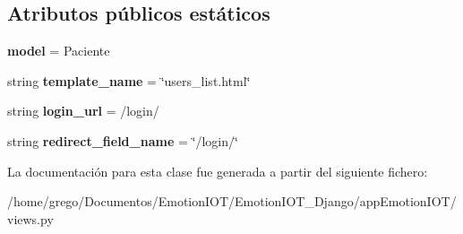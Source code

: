 \subsection*{Atributos públicos estáticos}
\begin{DoxyCompactItemize}
\item 
{\bfseries model} = Paciente\hypertarget{classappEmotionIOT_1_1views_1_1Users__list_a25c0ed097afe7417f42c175f9f0f4cbf}{}\label{classappEmotionIOT_1_1views_1_1Users__list_a25c0ed097afe7417f42c175f9f0f4cbf}

\item 
string {\bfseries template\+\_\+name} = \char`\"{}users\+\_\+list.\+html\char`\"{}\hypertarget{classappEmotionIOT_1_1views_1_1Users__list_a4b5f66aeb99394a4411228e8cb635e5e}{}\label{classappEmotionIOT_1_1views_1_1Users__list_a4b5f66aeb99394a4411228e8cb635e5e}

\item 
string {\bfseries login\+\_\+url} = \textquotesingle{}/login/\textquotesingle{}\hypertarget{classappEmotionIOT_1_1views_1_1Users__list_abe73aca2ce20225d9c98b0589d11c3e5}{}\label{classappEmotionIOT_1_1views_1_1Users__list_abe73aca2ce20225d9c98b0589d11c3e5}

\item 
string {\bfseries redirect\+\_\+field\+\_\+name} = \char`\"{}/login/\char`\"{}\hypertarget{classappEmotionIOT_1_1views_1_1Users__list_ac06e156a710f61beac838734df6d5896}{}\label{classappEmotionIOT_1_1views_1_1Users__list_ac06e156a710f61beac838734df6d5896}

\end{DoxyCompactItemize}


La documentación para esta clase fue generada a partir del siguiente fichero\+:\begin{DoxyCompactItemize}
\item 
/home/grego/\+Documentos/\+Emotion\+I\+O\+T/\+Emotion\+I\+O\+T\+\_\+\+Django/app\+Emotion\+I\+O\+T/views.\+py\end{DoxyCompactItemize}
